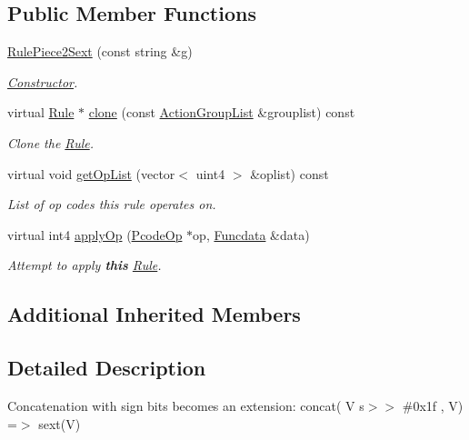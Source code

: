 \subsection*{Public Member Functions}
\begin{DoxyCompactItemize}
\item 
\mbox{\hyperlink{class_rule_piece2_sext_ae5fd1631c104ffecd56818d85f99cd09}{Rule\+Piece2\+Sext}} (const string \&g)
\begin{DoxyCompactList}\small\item\em \mbox{\hyperlink{class_constructor}{Constructor}}. \end{DoxyCompactList}\item 
virtual \mbox{\hyperlink{class_rule}{Rule}} $\ast$ \mbox{\hyperlink{class_rule_piece2_sext_afe4ede287edfde1d4036142f24469728}{clone}} (const \mbox{\hyperlink{class_action_group_list}{Action\+Group\+List}} \&grouplist) const
\begin{DoxyCompactList}\small\item\em Clone the \mbox{\hyperlink{class_rule}{Rule}}. \end{DoxyCompactList}\item 
virtual void \mbox{\hyperlink{class_rule_piece2_sext_aadf1e83d42fa92a680d1b3b1ee68fa1e}{get\+Op\+List}} (vector$<$ uint4 $>$ \&oplist) const
\begin{DoxyCompactList}\small\item\em List of op codes this rule operates on. \end{DoxyCompactList}\item 
virtual int4 \mbox{\hyperlink{class_rule_piece2_sext_a37acf429e9c05f9f03977b136b3bfc22}{apply\+Op}} (\mbox{\hyperlink{class_pcode_op}{Pcode\+Op}} $\ast$op, \mbox{\hyperlink{class_funcdata}{Funcdata}} \&data)
\begin{DoxyCompactList}\small\item\em Attempt to apply {\bfseries{this}} \mbox{\hyperlink{class_rule}{Rule}}. \end{DoxyCompactList}\end{DoxyCompactItemize}
\subsection*{Additional Inherited Members}


\subsection{Detailed Description}
Concatenation with sign bits becomes an extension\+: {\ttfamily concat( V s$>$$>$ \#0x1f , V) =$>$ sext(\+V)} 

